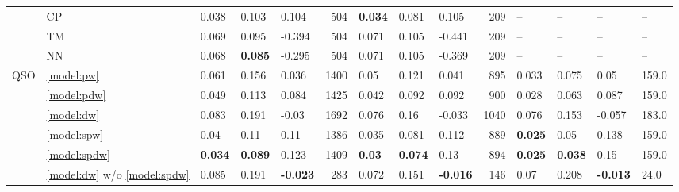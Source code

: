\documentclass[fleqn,usenatbib]{mnras}
\begin{document}
\begin{table}
\begin{tabular}{lllllrlllrllll}
                & CP &              0.038 &           0.103 &            0.104 &         504 &     \textbf{0.034} &           0.081 &            0.105 &         209 &                 -- &              -- &               -- &          -- \\
                & TM &              0.069 &           0.095 &           -0.394 &         504 &              0.071 &           0.105 &           -0.441 &         209 &                 -- &              -- &               -- &          -- \\
                & NN &              0.068 &  \textbf{0.085} &           -0.295 &         504 &              0.071 &           0.105 &           -0.369 &         209 &                 -- &              -- &               -- &          -- \\
            QSO & \ref{model:pw} &              0.061 &           0.156 &            0.036 &        1400 &               0.05 &           0.121 &            0.041 &         895 &              0.033 &           0.075 &             0.05 &       159.0 \\
                & \ref{model:pdw} &              0.049 &           0.113 &            0.084 &        1425 &              0.042 &           0.092 &            0.092 &         900 &              0.028 &           0.063 &            0.087 &       159.0 \\
                & \ref{model:dw} &              0.083 &           0.191 &            -0.03 &        1692 &              0.076 &            0.16 &           -0.033 &        1040 &              0.076 &           0.153 &           -0.057 &       183.0 \\
                & \ref{model:spw} &               0.04 &            0.11 &             0.11 &        1386 &              0.035 &           0.081 &            0.112 &         889 &     \textbf{0.025} &            0.05 &            0.138 &       159.0 \\
                & \ref{model:spdw} &     \textbf{0.034} &  \textbf{0.089} &            0.123 &        1409 &      \textbf{0.03} &  \textbf{0.074} &             0.13 &         894 &     \textbf{0.025} &  \textbf{0.038} &             0.15 &       159.0 \\
                & \ref{model:dw} w/o \ref{model:spdw} &              0.085 &           0.191 &  \textbf{-0.023} &         283 &              0.072 &           0.151 &  \textbf{-0.016} &         146 &               0.07 &           0.208 &  \textbf{-0.013} &        24.0 \\

\end{tabular}
\end{table}
\end{document}
